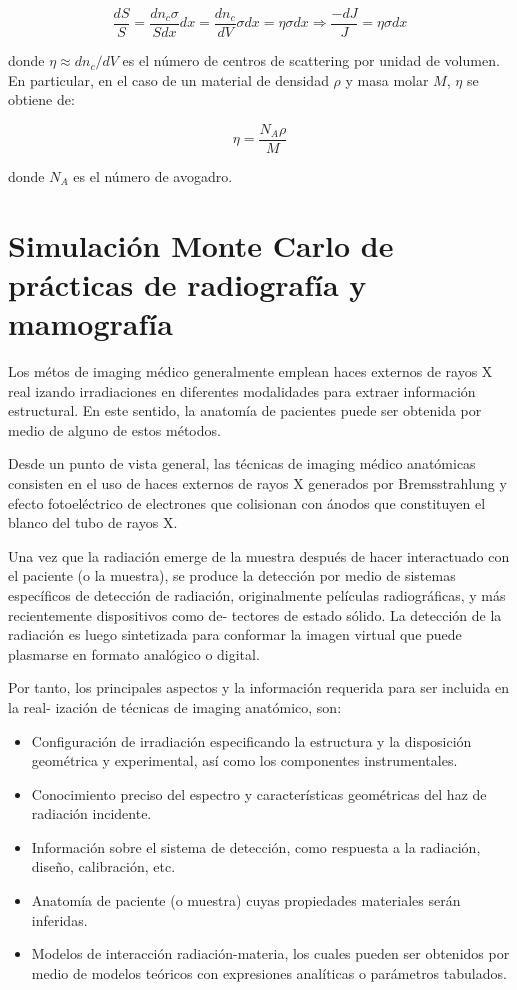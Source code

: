 \begin{equation}
 \frac{dS}{S} = \frac{dn_{c} \sigma}{S dx} dx = \frac{dn_{c}}{dV} \sigma dx = \eta \sigma dx \Rightarrow \frac{-dJ}{J} = \eta \sigma dx
\end{equation}

\noindent
donde $\eta \approx dn_{c}/dV$ es el número de centros de scattering por unidad de volumen. En particular, en el caso de un material de densidad $\rho$ y masa molar $M$, $\eta$ se obtiene de:

\begin{equation}
 \eta = \frac{N_{A}\rho}{M}
\end{equation}

\noindent
donde $N_{A}$ es el número de avogadro.

\section{Simulaci\'on Monte Carlo de pr\'acticas de radiograf\'ia y mamograf\'ia}

Los métos de imaging médico generalmente emplean haces externos de rayos X real izando irradiaciones en diferentes modalidades para extraer información estructural. En este sentido, la anatomía de pacientes puede ser obtenida por medio de alguno de estos métodos.

Desde un punto de vista general, las técnicas de imaging médico anatómicas consisten en el uso de haces externos de rayos X generados por Bremsstrahlung y efecto fotoeléctrico de electrones que colisionan con ánodos que constituyen el blanco del tubo de rayos X.

Una vez que la radiación emerge de la muestra después de hacer interactuado con el paciente (o la muestra), se produce la detección por medio de sistemas específicos de detección de radiación, originalmente películas radiográficas, y más recientemente dispositivos como de-
tectores de estado sólido. La detección de la radiación es luego sintetizada para conformar la imagen virtual que puede
plasmarse en formato analógico o digital. 

Por tanto, los principales aspectos y la información requerida para ser incluida en la real-
ización de técnicas de imaging anatómico, son:

\begin{itemize}
 \item Configuración de irradiación especificando la estructura y la disposición geométrica y experimental, así como los componentes instrumentales.
 \item Conocimiento preciso del espectro y características geométricas del haz de radiación incidente.
 \item Información sobre el sistema de detección, como respuesta a la radiación, diseño, calibración, etc.
 \item Anatomía de paciente (o muestra) cuyas propiedades materiales serán inferidas.
 \item Modelos de interacción radiación-materia, los cuales pueden ser obtenidos por medio de modelos teóricos con expresiones analíticas o parámetros tabulados.
\end{itemize}
